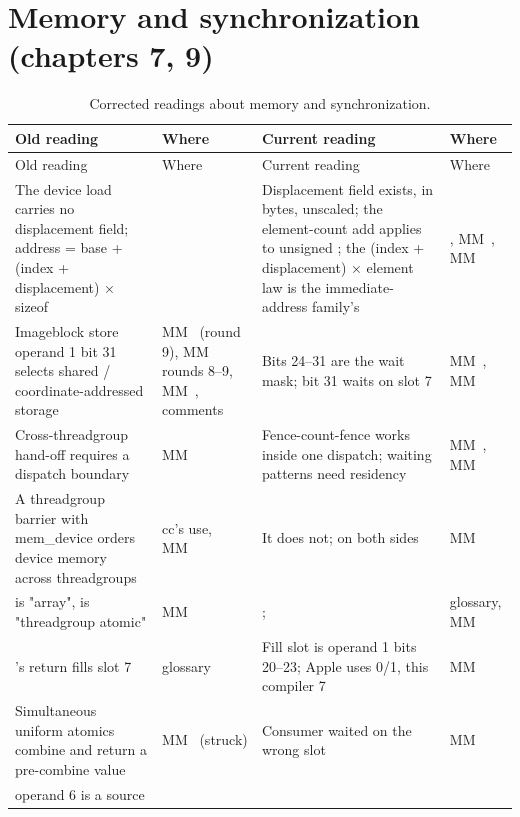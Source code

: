 \section{Memory and synchronization (chapters 7, 9)}\label{sec:memory-synchronization-chapters-2}

\begin{xltabular}{\linewidth}{@{}>{\hsize}X>{\hsize}X>{\hsize}X>{\hsize}X@{}}
\caption{Corrected readings about memory and synchronization.}\label{tab:corr-memory-sync}\\
\toprule
Old reading & Where & Current reading & Where \\
\midrule
\endfirsthead
{}
\toprule
Old reading & Where & Current reading & Where \\
\midrule
\endhead
The device load carries no displacement field; address = base + (index +
displacement) × sizeof &  & Displacement field exists, in bytes, unscaled; the element-count add
applies to unsigned ; the (index + displacement) × element
law is the immediate-address family's & , MM~, MM~ \\
Imageblock store operand 1 bit 31 selects shared / coordinate-addressed
storage & MM~ (round 9), MM~ rounds 8–9, MM~,
 comments & Bits 24–31 are the wait mask; bit 31 waits on slot 7 & MM~, MM~ \\
Cross-threadgroup hand-off requires a dispatch boundary & MM~ & Fence-count-fence works inside one dispatch; waiting patterns need
residency & MM~, MM~ \\
A threadgroup barrier with mem\_device orders device memory across
threadgroups & cc's  use, MM~ & It does not;  on both sides & MM~ \\
 is "array",  is "threadgroup atomic" & MM~ & ;  & glossary, MM~ \\
's
return fills slot 7 & glossary & Fill slot is operand 1 bits 20–23; Apple uses 0/1, this compiler 7 & MM~ \\
Simultaneous uniform atomics combine and return a pre-combine value & MM~ (struck) & Consumer waited on the wrong slot & MM~ \\
 operand 6 is a source

\end{xltabular}
